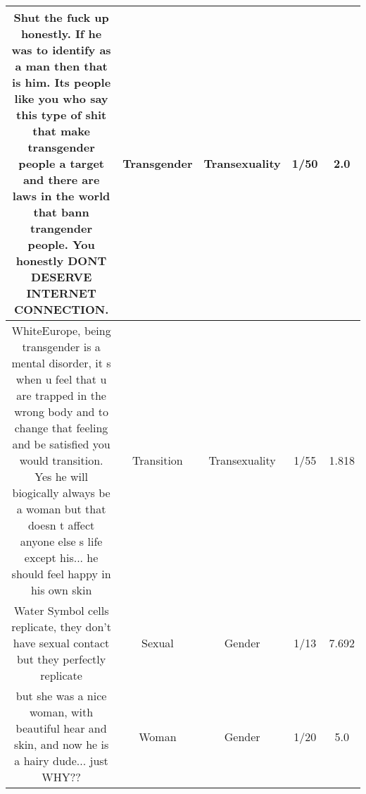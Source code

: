 \documentclass[11pt]{article}
\newlength\mylength
\begin{document}
\begin{center}
\begin{longtable}{|C{.40\mylength}|C{.30\mylength}|C{.15\mylength}|C{.15\mylength}|C{.15\mylength}|}
  Shut the fuck up honestly. If he was to identify as a man then that is him. Its people like you who say this type of shit that make transgender people a target and there are laws in the world that bann trangender people. You honestly DONT DESERVE INTERNET CONNECTION.  & Transgender & Transexuality & 1/50 & 2.0 \\  \hline
  WhiteEurope, being transgender is a mental disorder, it s when u feel that u are trapped in the wrong body and to change that feeling and be satisfied you would transition. Yes he will biogically always be a woman but that doesn t affect anyone else s life except his... he should feel happy in his own skin  & Transition & Transexuality & 1/55 & 1.818 \\  \hline
  Water Symbol cells replicate, they don't have sexual contact but they perfectly replicate  & Sexual & Gender & 1/13 & 7.692 \\  \hline
  but she was a nice woman, with beautiful hear and skin, and now he is a hairy dude... just WHY??  & Woman & Gender & 1/20 & 5.0 \\  \hline

\end{longtable}
\end{center}
\end{document}
